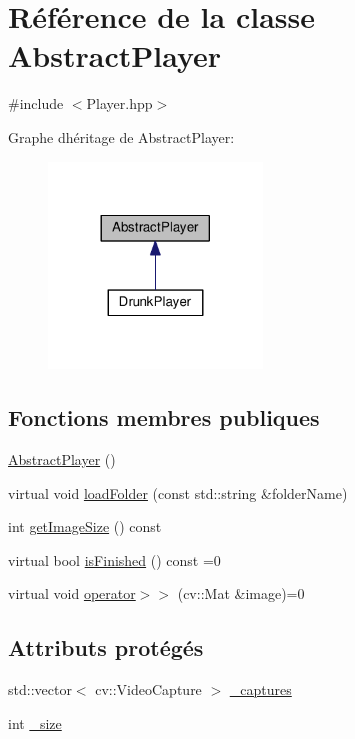 \hypertarget{classAbstractPlayer}{}\section{Référence de la classe Abstract\+Player}
\label{classAbstractPlayer}


{\ttfamily \#include $<$Player.\+hpp$>$}



Graphe d\textquotesingle{}héritage de Abstract\+Player\+:\nopagebreak
\begin{figure}[H]
\begin{center}
\leavevmode
\includegraphics[width=161pt]{d8/d3d/classAbstractPlayer__inherit__graph}
\end{center}
\end{figure}
\subsection*{Fonctions membres publiques}
\begin{DoxyCompactItemize}
\item 
\hyperlink{classAbstractPlayer_a4987602a4b3381a9c592585dde7cf33b}{Abstract\+Player} ()
\item 
virtual void \hyperlink{classAbstractPlayer_a2091b1757bfd13116dfa4612af55473b}{load\+Folder} (const std\+::string \&folder\+Name)
\item 
int \hyperlink{classAbstractPlayer_a8bdc017fb32c90e6635ed6b7491fbe98}{get\+Image\+Size} () const 
\item 
virtual bool \hyperlink{classAbstractPlayer_a841896a599ebe6b8317905de78c44bcc}{is\+Finished} () const =0
\item 
virtual void \hyperlink{classAbstractPlayer_a5c9a863c96224dd297aa44c69010cd94}{operator$>$$>$} (cv\+::\+Mat \&image)=0
\end{DoxyCompactItemize}
\subsection*{Attributs protégés}
\begin{DoxyCompactItemize}
\item 
std\+::vector$<$ cv\+::\+Video\+Capture $>$ \hyperlink{classAbstractPlayer_a72dd2ef25310decd45671a7d51e1f319}{\+\_\+captures}
\item 
int \hyperlink{classAbstractPlayer_a9d8395a141cc985622d4910209bc7d53}{\+\_\+size}
\end{DoxyCompactItemize}


